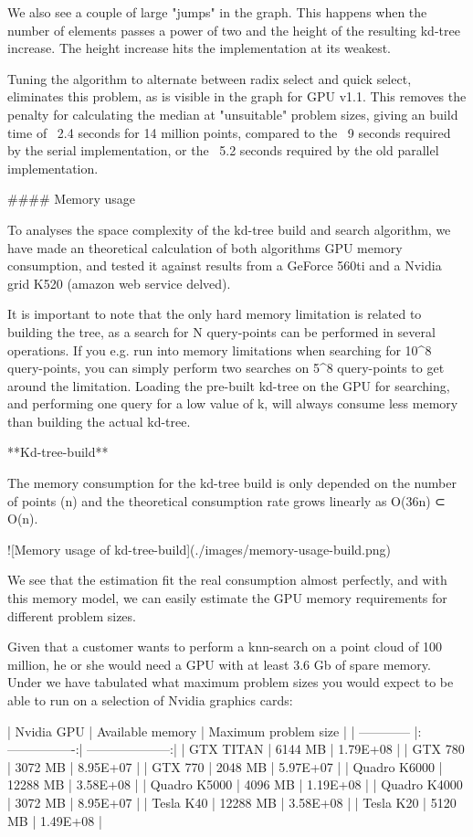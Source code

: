 We also see a couple of large "jumps" in the graph. This happens when the number of elements passes a power of two and the height of the resulting kd-tree increase. The height increase hits the implementation at its weakest.

Tuning the algorithm to alternate between radix select and quick select, eliminates this problem, as is visible in the graph for GPU v1.1. This removes the penalty for calculating the median at "unsuitable" problem sizes, giving an build time of ~2.4 seconds for 14 million points, compared to the ~9 seconds required by the serial implementation, or the ~5.2 seconds required by the old parallel implementation.


#### Memory usage

To analyses the space complexity of the kd-tree build and search algorithm, we have made an theoretical calculation of both algorithms GPU memory consumption, and tested it against results from a GeForce 560ti and a Nvidia grid K520 (amazon web service delved).

It is important to note that the only hard memory limitation is related to building the tree, as a search for N query-points can be performed in several operations. If you e.g. run into memory limitations when searching for 10^8 query-points, you can simply perform two searches on 5^8 query-points to get around the limitation. Loading the pre-built kd-tree on the GPU for searching, and performing one query for a low value of k, will always consume less memory than building the actual kd-tree.

**Kd-tree-build**

The memory consumption for the kd-tree build is only depended on the number of points (n) and the theoretical consumption rate grows linearly as O(36n) ⊂ O(n).

![Memory usage of kd-tree-build](./images/memory-usage-build.png)

We see that the estimation fit the real consumption almost perfectly, and with this memory model, we can easily estimate the GPU memory requirements for different problem sizes.

Given that a customer wants to perform a knn-search on a point cloud of 100 million, he or she would need a GPU with at least 3.6 Gb of spare memory. Under we have tabulated what maximum problem sizes you would expect to be able to run on a selection of Nvidia graphics cards:

| Nvidia GPU   | Available memory | Maximum problem size |
| ------------ |:----------------:| --------------------:|
| GTX TITAN    | 6144 MB          | 1.79E+08             |
| GTX 780      | 3072 MB          | 8.95E+07             |
| GTX 770      | 2048 MB          | 5.97E+07             |
| Quadro K6000 | 12288 MB         | 3.58E+08             |
| Quadro K5000 | 4096 MB          | 1.19E+08             |
| Quadro K4000 | 3072 MB          | 8.95E+07             |
| Tesla K40    | 12288 MB         | 3.58E+08             |
| Tesla K20    | 5120 MB          | 1.49E+08             |

